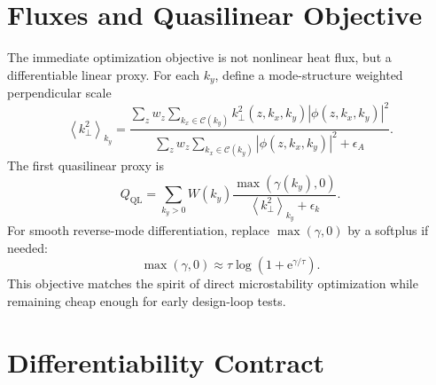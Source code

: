 \documentclass[11pt,a4paper]{article}
\newcommand{\ee}{\mathrm{e}}
\newcommand{\kperp}{k_{\perp}}
\newcommand{\avg}[1]{\left\langle #1 \right\rangle}
\begin{document}
\section{Fluxes and Quasilinear Objective}

The immediate optimization objective is not nonlinear heat flux, but a differentiable linear proxy.  For each \(k_y\), define a mode-structure weighted perpendicular scale
\begin{equation}
  \avg{\kperp^2}_{k_y}
  =
  \frac{
    \displaystyle
    \sum_z w_z
    \sum_{k_x\in\mathcal{C}(k_y)}
    \kperp^2(z,k_x,k_y)|\phi(z,k_x,k_y)|^2
  }{
    \displaystyle
    \sum_z w_z
    \sum_{k_x\in\mathcal{C}(k_y)}
    |\phi(z,k_x,k_y)|^2+\epsilon_A
  }.
  \label{eq:kperp-average}
\end{equation}
The first quasilinear proxy is
\begin{equation}
  Q_{\mathrm{QL}}
  =
  \sum_{k_y>0}
  W(k_y)
  \frac{\max(\gamma(k_y),0)}{\avg{\kperp^2}_{k_y}+\epsilon_k}.
  \label{eq:ql-proxy}
\end{equation}
For smooth reverse-mode differentiation, replace \(\max(\gamma,0)\) by a softplus if needed:
\begin{equation}
  \max(\gamma,0)
  \approx
  \tau\log\left(1+\ee^{\gamma/\tau}\right).
  \label{eq:softplus-growth}
\end{equation}
This objective matches the spirit of direct microstability optimization while remaining cheap enough for early design-loop tests.

\section{Differentiability Contract}
\end{document}
